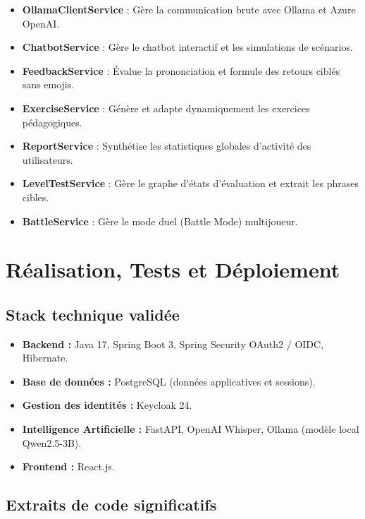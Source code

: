 \documentclass[12pt,a4paper]{report}
\begin{document}
\begin{itemize}[leftmargin=2cm]
    \item \textbf{OllamaClientService} : Gère la communication brute avec Ollama et Azure OpenAI.
    \item \textbf{ChatbotService} : Gère le chatbot interactif et les simulations de scénarios.
    \item \textbf{FeedbackService} : Évalue la prononciation et formule des retours ciblés sans emojis.
    \item \textbf{ExerciseService} : Génère et adapte dynamiquement les exercices pédagogiques.
    \item \textbf{ReportService} : Synthétise les statistiques globales d'activité des utilisateurs.
    \item \textbf{LevelTestService} : Gère le graphe d'états d'évaluation et extrait les phrases cibles.
    \item \textbf{BattleService} : Gère le mode duel (Battle Mode) multijoueur.
\end{itemize}

\chapter{Réalisation, Tests et Déploiement}

\section{Stack technique validée}
\begin{itemize}[leftmargin=2cm]
    \item \textbf{Backend :} Java 17, Spring Boot 3, Spring Security OAuth2 / OIDC, Hibernate.
    \item \textbf{Base de données :} PostgreSQL (données applicatives et sessions).
    \item \textbf{Gestion des identités :} Keycloak 24.
    \item \textbf{Intelligence Artificielle :} FastAPI, OpenAI Whisper, Ollama (modèle local Qwen2.5-3B).
    \item \textbf{Frontend :} React.js.
\end{itemize}

\section{Extraits de code significatifs}
\end{document}
